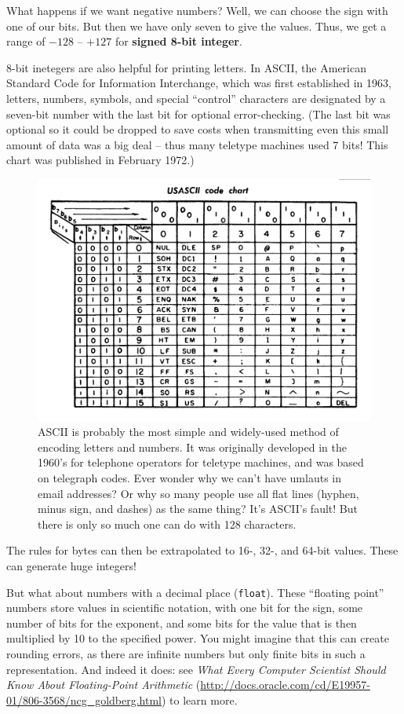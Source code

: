 \documentclass[a4paper,10pt]{scrartcl}
\begin{document}
What happens if we want negative numbers? Well, we can choose the sign with one of our bits. But then we have only seven to give the values. Thus, we get a range of $-128$ -- $+127$ for \textbf{signed 8-bit integer}.

8-bit inetegers are also helpful for printing letters. In ASCII, the American Standard Code for Information Interchange, which was first established in 1963, letters, numbers, symbols, and special ``control'' characters are designated by a seven-bit number with the last bit for optional error-checking. (The last bit was optional so it could be dropped to save costs when transmitting even this small amount of data was a big deal -- thus many teletype machines used 7 bits! This chart was published in February 1972.)

\begin{figure}[!ht]
\begin{center}
\includegraphics[width=.8\linewidth]{figures/Introduction/ASCII_Code_Chart-Quick_ref_card.png}
\end{center}
\caption{ASCII is probably the most simple and widely-used method of encoding letters and numbers. It was originally developed in the 1960's for telephone operators for teletype machines, and was based on telegraph codes. Ever wonder why we can't have umlauts in email addresses? Or why so many people use all flat lines (hyphen, minus sign, and dashes) as the same thing? It's ASCII's fault! But there is only so much one can do with 128 characters.}
\end{figure}

The rules for bytes can then be extrapolated to 16-, 32-, and 64-bit values. These can generate huge integers!

But what about numbers with a decimal place (\lstinline{float}). These ``floating point'' numbers store values in scientific notation, with one bit for the sign, some number of bits for the exponent, and some bits for the value that is then multiplied by 10 to the specified power. You might imagine that this can create rounding errors, as there are infinite numbers but only finite bits in such a representation. And indeed it does: see \emph{What Every Computer Scientist Should Know About Floating-Point Arithmetic} (\url{http://docs.oracle.com/cd/E19957-01/806-3568/ncg_goldberg.html}) to learn more.
\end{document}
